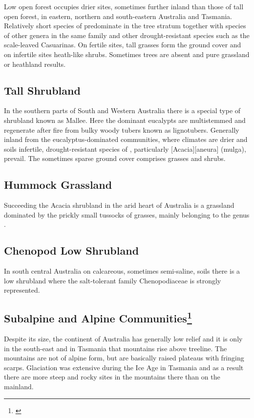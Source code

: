 Low open forest occupies drier sites, sometimes further inland than those of tall open forest, in eastern, northern and south-eastern Australia and Tasmania.
Relatively short species of  predominate in the tree stratum together with species of other genera in the same family and other drought-resistant species such as the scale-leaved Casuarinas.
On fertile sites, tall grasses form the ground cover and on infertile sites heath-like shrubs.
Sometimes trees are absent and pure grassland or heathland results.

\subsection{Tall Shrubland}

In the southern parts of South and Western Australia there is a special type of shrubland known as Mallee.
Here the dominant eucalypts are multistemmed and regenerate after fire from bulky woody tubers known as lignotubers.
Generally inland from the eucalyptus-dominated communities, where climates are drier and soils infertile, drought-resistant species of , particularly [Acacia][aneura] (mulga), prevail.
The sometimes sparse ground cover comprises grasses and shrubs.

\subsection{Hummock Grassland}

Succeeding the Acacia shrubland in the arid heart of Australia is a grassland dominated by the prickly small tussocks of grasses, mainly belonging to the genus .

\subsection{Chenopod Low Shrubland}

In south central Australia on calcareous, sometimes semi-saline, soils there is a low shrubland where the salt-tolerant family Chenopodiaceae is strongly represented.

\subsection[Subalpine and Alpine Communities]{Subalpine and Alpine Communities\thinspace\footnote{\cite{harris1970alpine}}}

Despite its size, the continent of Australia has generally low relief and it is only in the south-east and in Tasmania that mountains rise above treeline.
The mountains are not of alpine form, but are basically raised plateaus with fringing scarps.
Glaciation was extensive during the Ice Age in Tasmania and as a result there are more steep and rocky sites in the mountains there than on the mainland.


